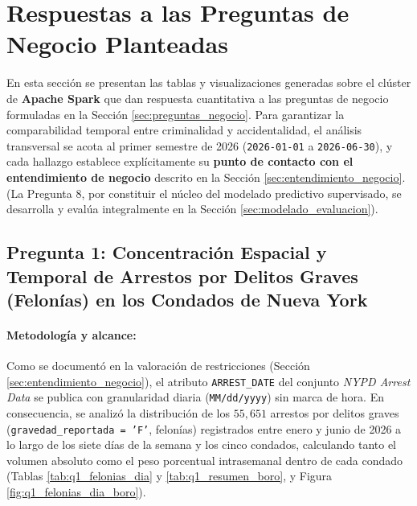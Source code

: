 \section{Respuestas a las Preguntas de Negocio Planteadas}
\label{sec:respuestas_preguntas}

En esta sección se presentan las tablas y visualizaciones generadas sobre el clúster de \textbf{Apache Spark} que dan respuesta cuantitativa a las preguntas de negocio formuladas en la Sección \ref{sec:preguntas_negocio}. Para garantizar la comparabilidad temporal entre criminalidad y accidentalidad, el análisis transversal se acota al primer semestre de 2026 (\texttt{2026-01-01} a \texttt{2026-06-30}), y cada hallazgo establece explícitamente su \textbf{punto de contacto con el entendimiento de negocio} descrito en la Sección \ref{sec:entendimiento_negocio}. (La Pregunta 8, por constituir el núcleo del modelado predictivo supervisado, se desarrolla y evalúa integralmente en la Sección \ref{sec:modelado_evaluacion}).

\subsection{Pregunta 1: Concentración Espacial y Temporal de Arrestos por Delitos Graves (Felonías) en los Condados de Nueva York}
\label{subsec:respuesta_q1}

\paragraph{Metodología y alcance:} Como se documentó en la valoración de restricciones (Sección \ref{sec:entendimiento_negocio}), el atributo \texttt{ARREST\_DATE} del conjunto \textit{NYPD Arrest Data} se publica con granularidad diaria (\texttt{MM/dd/yyyy}) sin marca de hora. En consecuencia, se analizó la distribución de los $55,651$ arrestos por delitos graves (\texttt{gravedad\_reportada = 'F'}, felonías) registrados entre enero y junio de 2026 a lo largo de los siete días de la semana y los cinco condados, calculando tanto el volumen absoluto como el peso porcentual intrasemanal dentro de cada condado (Tablas \ref{tab:q1_felonias_dia} y \ref{tab:q1_resumen_boro}, y Figura \ref{fig:q1_felonias_dia_boro}).

